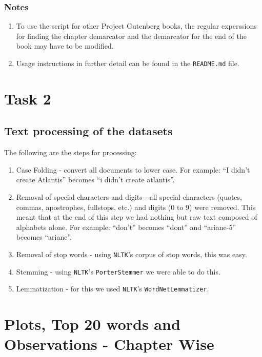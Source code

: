 \documentclass{article}
\begin{document}
\begin{flushleft}
\subsubsection*{Notes}
\begin{enumerate}
	\item To use the script for other Project Gutenberg books, the regular experssions for finding the chapter demarcator and the demarcator for the end of the book may have to be modified.
	\item Usage instructions in further detail can be found in the \verb|README.md| file.
\end{enumerate}
\end{flushleft}
\newpage

\section{Task 2}
\subsection{Text processing of the datasets}
\begin{flushleft}
	The following are the steps for processing:
	\begin{enumerate}
        \item Case Folding - convert all documents to lower case. For example: ``I didn't create Atlantis'' becomes ``i didn't create atlantis''.
        \item Removal of special characters and digits - all special characters (quotes, commas, apostrophes, fullstops, etc.) and digits (0 to 9) were removed. This meant that at the end of this step we had nothing but raw text composed of alphabets alone. For example: ``don't'' becomes ``dont'' and ``ariane-5'' becomes ``ariane''.
		\item Removal of stop words - using \texttt{NLTK}'s corpus of stop words, this was easy.
		\item Stemming - using \texttt{NLTK}'s \texttt{PorterStemmer} we were able to do this.
		\item Lemmatization - for this we used \texttt{NLTK}'s \texttt{WordNetLemmatizer}.
	\end{enumerate}
\end{flushleft}

\section{Plots, Top 20 words and Observations - Chapter Wise}
\end{document}
